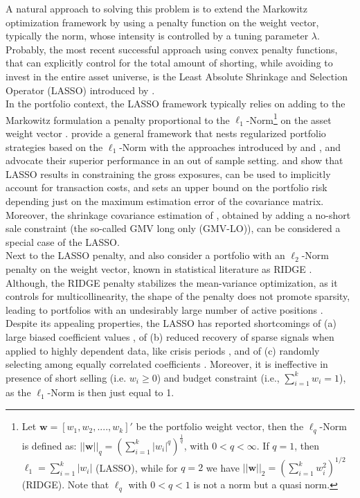 \documentclass[12pt, a4paper]{article}
\newcommand{\bfw}{\boldsymbol{w} }
\begin{document}
A natural approach to solving this problem is to extend the Markowitz optimization framework by using a penalty function on the weight vector, typically the norm, whose intensity is controlled by a tuning parameter $\lambda$. Probably, the most recent successful approach using convex penalty functions, that can explicitly control for the total amount of shorting, while avoiding to invest in the entire asset universe, is the Least Absolute Shrinkage and Selection Operator (LASSO) introduced by \citet{Tibshirani1996}. \\
In the portfolio context, the LASSO framework typically relies on adding to the Markowitz formulation a penalty proportional to the $\ell_{1}$-Norm\footnote{Let $\bfw = [w_{1}, w_{2}, ...., w_{k}]'$ be the portfolio weight vector, then the $\ell_{q}$-Norm is defined as: $||\bfw||_{q} = (\sum_{i=1}^{k} |w_{i}|^{q})^{\frac{1}{q}}$, with $0< q < \infty$. If $q=1$, then  $\ell_{1} = \sum_{i=1}^{k} |w_{i}|$ (LASSO), while for $q=2$ we have $||\bfw||_{2} = (\sum_{i=1}^{k} w_{i}^{2})^{1/2}$ (RIDGE). Note that $\ell_{q}$ with $0<q<1$ is not a norm but a quasi norm.} on the asset weight vector \citep{Brodie2009, DeMiguel2009a, Carrasco2012, Fan2012}. \cite{DeMiguel2009a} provide a general framework that nests regularized portfolio strategies based on the $\ell_{1}$-Norm with the approaches introduced by \cite{Ledoit2003} and \cite{Jagannathan2003}, and advocate their superior performance in an out of sample setting. \cite{Brodie2009} and \citet{Fan2012} show that LASSO results in constraining the gross exposures, can be used to implicitly account for transaction costs, and sets an upper bound on the portfolio risk depending just on the maximum estimation error of the covariance matrix. Moreover, the shrinkage covariance estimation of \cite{Jagannathan2003}, obtained by adding a no-short sale constraint (the so-called GMV long only (GMV-LO)), can be considered a special case of the LASSO.\\
Next to the LASSO penalty, \cite{Brodie2009} and \cite{DeMiguel2009} also consider a portfolio with an $\ell_{2}$-Norm penalty on the weight vector, known in statistical literature as RIDGE \citep{Hoerl1988}. Although, the RIDGE penalty stabilizes the mean-variance optimization, as it controls for multicollinearity, the shape of the penalty does not promote sparsity, leading to portfolios with an undesirably large number of active positions \citep{Carrasco2012}.\\
Despite its appealing properties, the LASSO has reported shortcomings of (a) large biased coefficient values \citep{Gasso2010, Fastrich2015}, of (b) reduced recovery of sparse signals when applied to highly dependent data, like crisis periods \citep{Giuzio2016a}, and of (c) randomly selecting among equally correlated coefficients \citep{Bondell2008}. Moreover, it is ineffective in presence of short selling (i.e. $w_{i} \geq 0$) and  budget constraint (i.e., $\sum_{i=1}^{k} w_{i} = 1$), as the  $\ell_{1}$-Norm is then just equal to 1.\\
\end{document}
